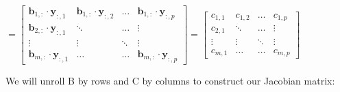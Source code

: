 \documentclass{article}
\begin{document}
\begin{center}$
= \begin{bmatrix}
    \mathbf{b}_{1,:} \cdot \mathbf{y}_{:,1} & \mathbf{b}_{1,:} \cdot \mathbf{y}_{:,2} &\hdots & \mathbf{b}_{1,:} \cdot \mathbf{y}_{:,p} \\
    \mathbf{b}_{2,:} \cdot \mathbf{y}_{:,1}  & \ddots &\hdots & \vdots \\
    \vdots & \vdots & \ddots & \vdots\\
    \mathbf{b}_{m,:} \cdot \mathbf{y}_{:,1}  & \hdots & \hdots & \mathbf{b}_{m,:} \cdot \mathbf{y}_{:,p}
\end{bmatrix}
= \begin{bmatrix}
    c_{1,1} & c_{1,2} &\hdots & c_{1,p} \\
    c_{2,1}  & \ddots &\hdots & \vdots \\
    \vdots & \vdots & \ddots & \vdots\\
    c_{m,1}  & \hdots & \hdots & c_{m,p}
\end{bmatrix}
$
\end{center}
We will unroll B by rows and C by columns to construct our Jacobian matrix:
\end{document}
